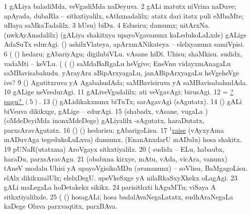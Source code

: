 \noindent 
\gl{\pagu}
\bmng
\bnum
\num{1}  gALiya baladiMda, veVgadiMda naDeyuva. 
\num{2}  gALi matutx niVrina naDuve; apAyada, dubaRla -- sithxtiyalilx, sAthxnadalilx; atatx dari itatx puli eMbaMte; uBaya saMkaTadalilx. 
\num{3}  hUsu) biDu. 
\num{4}  Edusiru; damumx; nitArxNa. 
\hypertarget{wind pagu5}{} 
  
\banum
{} (nwkAyAnadalilx) (gALiya shakitxya upayoVgavanunx kaLedukoLaLxde) gALige AdaSuTx edurAgi. 
 (\rUpa) ashilxVlateya, apArxmANikateya -- elelxyanunx samiVpisi. 
\eanum
\numie
\num{6}  (  (\AmA) hedaru; gAbariyAgu; digilubiVLu. 
  
\banum
{} vAsane hiDi. 
 Uhisu; shaMkisu. 
 sudidx, vadaMti -- keVLu. 
\eanum
\numie
{}  (  (  (\rUpa) 
\banum
{} saMdaBaRgaLu heVgive; EneVnu vidayxmAnagaLu saMBavisabahudu. 
 yArayAra aBipArxyagaLu, janABipArxyagaLu heVgeheVge ive? 
\eanum
\numie
\num{9}  (\rUpa) Agutitxruva yA AgabahudAda; saMBavisiruva yA saMBavisabahudAda. 
\num{10}  gALige neVredurAgi. 
\num{11}  gALiveVgadalilx; ati veVgavAgi; birusAgi. 
\num{12}  = \hyperlink{wind pagu5}{?pagu? \((5)\)}. 
\num{13}  (\nw) gALidikakxnunx biTuTx; sarAgavAgi (sAgutatx). 
\num{14}  (\nw) gALi biVsuva dikikxge, gALige -- edurAgi. 
\num{15}  (shabadx, vAsane, \mo vugaLa \vi) (oMdeDeyiMda inonxMdeDege) gALiyalilx -sAgutatx, haraDutatx, parxsAravAgutatx. 
\num{16}  (\AmA) (\ashi) hedarisu; gAbarigoLisu. 
\num{17} \hyperref{kandict_r.pdf}{R}{raise(1) pagu(16)}{$^1$raise}  
  
\banum
{} (vAyxyAma mADuvAga tegedukoLuLxva) damumx. 
 (EnanAnxdarU mADalu) hosa shakitx. 
\eanum
\numie
\num{19}  pUNaR(utatxma) AroVgayx sithxtiyalilx. 
\num{20}  (  sudidx -- ELu, habaubx, haraDu, parxsAravAgu. 
\num{21}  (obabxna kirxye, mAtu, vAda, vicAra, \mo vanunx) tAneV modalu Uhisi yA upayoVgisikoMDu (avananunx) -- soVlisu, BaMgagoLisu. 
  
\banum
{} elAlx dikikxnalUlx; elelxDegU. 
 upeVkeSxge yA nilaRkaSxyXkekx oLagAgi. 
\eanum
\numie
\num{23}  gALi maLegaLa hoDetakekx sikikx. 
\num{24}  parisithxti hAguMTu; viSaya A sithxtiyalilxde. 
\num{25}  (  (\rUpa) hosagALi; hosa badalAvaNegaLatatx, sudhAraNegaLa kaDege Oluva parxvaqtitx, parxBAva. 
\enum
\emng
\eentry

